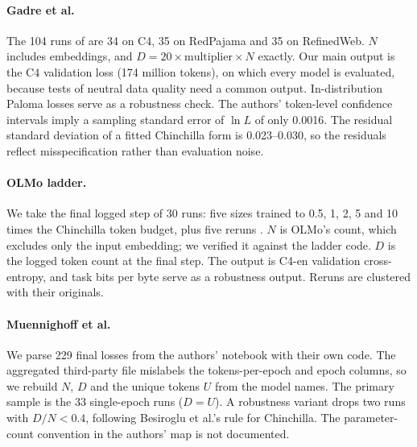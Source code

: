 \paragraph{Gadre et al.}
The 104 runs of \citet{gadre2024language} are 34 on C4, 35 on RedPajama and 35 on RefinedWeb. $N$ includes embeddings,
and $D=20\times\text{multiplier}\times N$ exactly. Our main output is the C4 validation loss (174 million tokens), on
which every model is evaluated, because tests of neutral data quality need a common output. In-distribution Paloma
losses serve as a robustness check. The authors' token-level confidence intervals imply a sampling standard error of
$\ln L$ of only 0.0016. The residual standard deviation of a fitted Chinchilla form is 0.023--0.030, so the residuals
reflect misspecification rather than evaluation noise.

\paragraph{OLMo ladder.}
We take the final logged step of 30 runs: five sizes trained to 0.5, 1, 2, 5 and 10 times the Chinchilla token budget,
plus five reruns \citep{bhagia2024establishing}. $N$ is OLMo's count, which excludes only the input embedding; we
verified it against the ladder code. $D$ is the logged token count at the final step. The output is C4-en validation
cross-entropy, and task bits per byte serve as a robustness output. Reruns are clustered with their originals.

\paragraph{Muennighoff et al.}
We parse 229 final losses from the authors' notebook with their own code. The aggregated third-party file mislabels
the tokens-per-epoch and epoch columns, so we rebuild $N$, $D$ and the unique tokens $U$ from the model names. The
primary sample is the 33 single-epoch runs ($D=U$). A robustness variant drops two runs with $D/N<0.4$, following
Besiroglu et al.'s rule for Chinchilla. The parameter-count convention in the authors' map is not documented.

